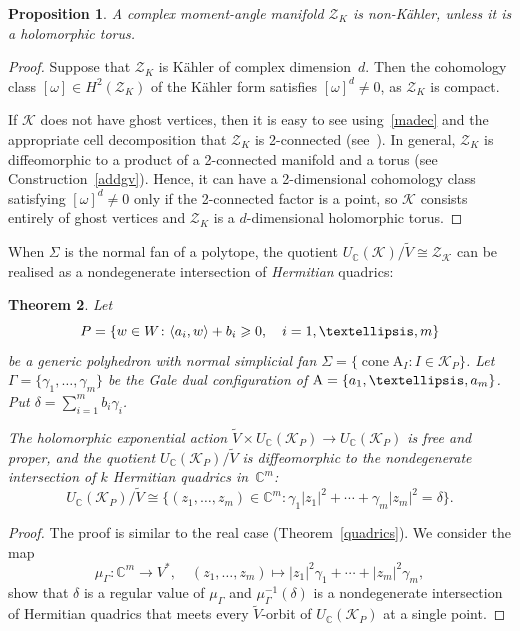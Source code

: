 \documentclass[a4paper]{amsart}
\newtheorem{theorem}{Theorem}[section]
\newtheorem{proposition}[theorem]{Proposition}
\theoremstyle{definition}
\theoremstyle{remark}
\numberwithin{equation}{section}
\def\C{\mathbb C}
\def\sK{\mathcal K}
\newcommand{\mb}[1]{{\textbf {\textit#1}}}
\renewcommand{\ge}{\geqslant}
\def\cone{\mathop{\mathrm{cone}}}
\newcommand{\zk}{\mathcal Z_{\mathcal K}}
\newcommand{\<}{\langle}
\renewcommand{\>}{\rangle}
\begin{document}
\begin{proposition}
A complex moment-angle manifold $\mathcal Z_K$ is non-K\"ahler, unless it is a holomorphic torus.
\end{proposition}
\begin{proof}
Suppose that $\mathcal Z_K$ is K\"ahler of complex dimension~$d$. Then the cohomology class $[\omega]\in H^2(\mathcal Z_K)$ of the K\"ahler form satisfies $[\omega]^d\ne0$, as $\mathcal Z_K$ is compact.
 
If $\mathcal K$ does not have ghost vertices, then it is easy to see using~\eqref{madec} and the appropriate cell decomposition that $\mathcal Z_K$ is 2-connected (see~\cite[Proposition~4.3.5]{bu-pa15}). In general, $\mathcal Z_K$ is diffeomorphic to a product of a 2-connected manifold and a torus (see Construction~\ref{addgv}). Hence, it can have a 2-dimensional cohomology class satisfying $[\omega]^d\ne0$ only if the 2-connected factor is a point, so $\mathcal K$ consists entirely of ghost vertices and $\mathcal Z_K$ is a $d$-dimensional holomorphic torus.
\end{proof}


When $\Sigma$ is the normal fan of a polytope, the quotient $U_\C(\sK)/\widetilde V\cong\zk$ can be realised as a nondegenerate intersection of \emph{Hermitian} quadrics:

\begin{theorem}\label{hquadrics}
Let 
\[
  P=\{\mb w\in W\colon\langle \mb a_i,\mb w\rangle+b_i\ge0,\quad i=1,\ldots,m\}
\]  
be a generic polyhedron with normal simplicial fan $\Sigma=\{\cone \mathrm A_I\colon I\in\mathcal K_P\}$. Let $\Gamma=\{\gamma_1,\ldots,\gamma_m\}$ be the Gale dual configuration of $\mathrm A=\{\mb a_1,\ldots,\mb a_m\}$. Put $\delta=\sum_{i=1}^mb_i\gamma_i$. 

The holomorphic exponential action $\widetilde V\times U_\C(\sK_P)\to U_\C(\sK_P)$ is free and proper, and the quotient $U_\C(\sK_P)/\widetilde V$ is diffeomorphic to the nondegenerate intersection of $k$ Hermitian quadrics in~$\C^m$:
\[
  U_\C(\sK_P)/\widetilde V\cong\{(z_1,\ldots,z_m)\in\C^m\colon
  \gamma_1 |z_1|^2+\cdots+\gamma_m|z_m|^2=\delta\}.
\]
\end{theorem}
\begin{proof}
The proof is similar to the real case (Theorem~\ref{quadrics}). We consider the map
\[
  \mu_\Gamma\colon\C^m\to V^*, \quad 
  (z_1,\ldots,z_m)\mapsto |z_1|^2\gamma_1+ \cdots+|z_m|^2\gamma_m,
\]
show that $\delta$ is a regular value of $\mu_\Gamma$ and $\mu_\Gamma^{-1}(\delta)$ is a nondegenerate intersection of Hermitian quadrics that meets every 
$\widetilde V$-orbit of $U_\C(\sK_P)$ at a single point.
\end{proof}
\end{document}
